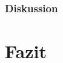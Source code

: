 \documentclass[12pt,a4paper]{article}
\begin{document}
\subsubsection*{Diskussion}


\section{Fazit}
\end{document}
